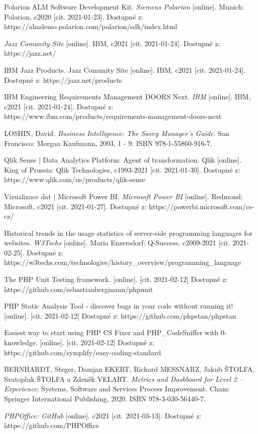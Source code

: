 \documentclass[czech,master]{diploma}
\begin{document}
\begin{thebibliography}{43}
Polarion ALM Software Development Kit. \textit{Siemens Polarion} [online]. Munich: Polarion, c2020 [cit. 2021-01-23]. Dostupné z: https://almdemo.polarion.com/polarion/sdk/index.html

\textit{Jazz Comunity Site} [online]. IBM, c2021 [cit. 2021-01-24]. Dostupné z: https://jazz.net/

IBM Jazz Products. Jazz Comunity Site [online]. IBM, c2021 [cit. 2021-01-24]. Dostupné z: https://jazz.net/products

IBM Engineering Requirements Management DOORS Next. \textit{IBM} [online]. IBM, c2021 [cit. 2021-01-24]. Dostupné z: https://www.ibm.com/products/requirements-management-doors-next

LOSHIN, David. \textit{Business Intelligence: The Savvy Manager's Guide}. San Francisco: Morgan Kaufmann, 2003, 1 - 9. ISBN 978-1-55860-916-7.

Qlik Sense | Data Analytics Platform: Agent of transformation. Qlik [online]. King of Prussia: Qlik Technologies, c1993-2021 [cit. 2021-01-30]. Dostupné z: https://www.qlik.com/us/products/qlik-sense

Vizualizace dat | Microsoft Power BI. \textit{Microsoft Power BI} [online]. Redmond: Microsoft, c2021 [cit. 2021-01-27]. Dostupné z: https://powerbi.microsoft.com/cs-cz/

Historical trends in the usage statistics of server-side programming languages for websites. \textit{W3Techs} [online]. Maria Enzersdorf: Q-Success, c2009-2021 [cit. 2021-02-25]. Dostupné z: https://w3techs.com/technologies/history\_overview/programming\_language

 The PHP Unit Testing framework. [online]. [cit. 2021-02-12] Dostupné z: https://github.com/sebastianbergmann/phpunit

 PHP Static Analysis Tool - discover bugs in your code without running it! [online]. [cit. 2021-02-12] Dostupné z: https://github.com/phpstan/phpstan

 Easiest way to start using PHP CS Fixer and PHP\_CodeSniffer with 0-knowledge. [online]. [cit. 2021-02-12] Dostupné z: https://github.com/symplify/easy-coding-standard

BERNHARDT, Steger, Damjan EKERT, Richard MESSNARZ, Jakub ŠTOLFA, Svatopluk ŠTOLFA a Zdeněk VELART. \textit{Metrics and Dashboard for Level 2 – Experience}: Systems, Software and Services Process Improvement. Cham: Springer International Publishing, 2020. ISBN 978-3-030-56440-7.

\textit{PHPOffice: GitHub} [online]. c2021 [cit. 2021-03-13]. Dostupné z: https://github.com/PHPOffice


\end{thebibliography}
\end{document}
